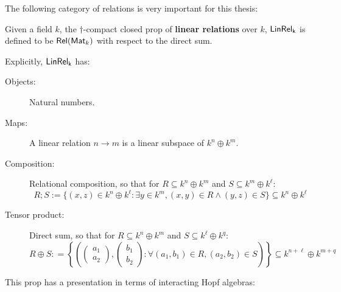 %
%
%
%
%
The following category of relations is very important for this thesis:
\begin{definition}
Given a field $k$, the $\dag$-compact closed prop of {\bf linear relations} over $k$, $\sf LinRel_{k}$ is defined to be $\mathsf{Rel}(\mathsf{Mat}_k)$ with respect to the direct sum.

Explicitly, $\sf LinRel_{k}$ has:
\begin{description}
\item[Objects:] Natural numbers.
\item[Maps:] A linear relation $n\to m$ is a linear subspace of $k^n \oplus k^m$.
\item[Composition:] Relational composition, so that for $R \subseteq k^n \oplus k^m$  and $S \subseteq k^m \oplus k^\ell$:
$$
R;S := \{  (x,z) \in k^{n} \oplus k^{\ell} : \exists y \in k^{m}, (x,y) \in R \wedge (y,z) \in S \} \subseteq k^n \oplus k^\ell
$$ 
\item[Tensor product:] Direct sum, so that for $R \subseteq k^n \oplus k^m$ and $S \subseteq k^\ell \oplus k^q$:
$$R\oplus S : =
\left\{
\left(
\begin{pmatrix}
a_1\\a_2
\end{pmatrix},
\begin{pmatrix}
b_1\\b_2
\end{pmatrix}
:
\forall (a_1,b_1) \in R, (a_2,b_2) \in S
\right)
\right\} \subseteq k^{n+\ell}\oplus k^{m+q}
$$
\end{description}
\end{definition}
This prop has a presentation in terms of interacting Hopf algebras:

